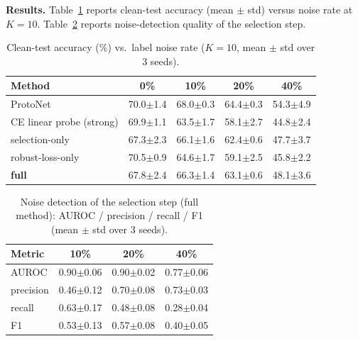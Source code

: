 \documentclass{article}
\begin{document}
\textbf{Results.} Table~\ref{tab:acc} reports clean-test accuracy (mean $\pm$ std) versus
noise rate at $K=10$. Table~\ref{tab:noise} reports noise-detection quality of the selection
step.

\begin{table}[t]
  \centering
  \caption{Clean-test accuracy (\%) vs.\ label noise rate ($K=10$, mean $\pm$ std over 3 seeds).}
  \label{tab:acc}
  \begin{tabular}{lcccc}
    \toprule
    Method                      & 0\%  & 10\% & 20\% & 40\% \\
    \midrule
    ProtoNet                    & 70.0$\pm$1.4 & 68.0$\pm$0.3 & 64.4$\pm$0.3 & 54.3$\pm$4.9 \\
    CE linear probe (strong)    & 69.9$\pm$1.1 & 63.5$\pm$1.7 & 58.1$\pm$2.7 & 44.8$\pm$2.4 \\
    selection-only              & 67.3$\pm$2.3 & 66.1$\pm$1.6 & 62.4$\pm$0.6 & 47.7$\pm$3.7 \\
    robust-loss-only            & 70.5$\pm$0.9 & 64.6$\pm$1.7 & 59.1$\pm$2.5 & 45.8$\pm$2.2 \\
    \textbf{full}               & 67.8$\pm$2.4 & 66.3$\pm$1.4 & 63.1$\pm$0.6 & 48.1$\pm$3.6 \\
    \bottomrule
  \end{tabular}
\end{table}

\begin{table}[t]
  \centering
  \caption{Noise detection of the selection step (full method): AUROC / precision / recall / F1
  (mean $\pm$ std over 3 seeds).}
  \label{tab:noise}
  \begin{tabular}{lccc}
    \toprule
    Metric    & 10\% & 20\% & 40\% \\
    \midrule
    AUROC     & 0.90$\pm$0.06 & 0.90$\pm$0.02 & 0.77$\pm$0.06 \\
    precision & 0.46$\pm$0.12 & 0.70$\pm$0.08 & 0.73$\pm$0.03 \\
    recall    & 0.63$\pm$0.17 & 0.48$\pm$0.08 & 0.28$\pm$0.04 \\
    F1        & 0.53$\pm$0.13 & 0.57$\pm$0.08 & 0.40$\pm$0.05 \\
    \bottomrule
  \end{tabular}
\end{table}
\end{document}
